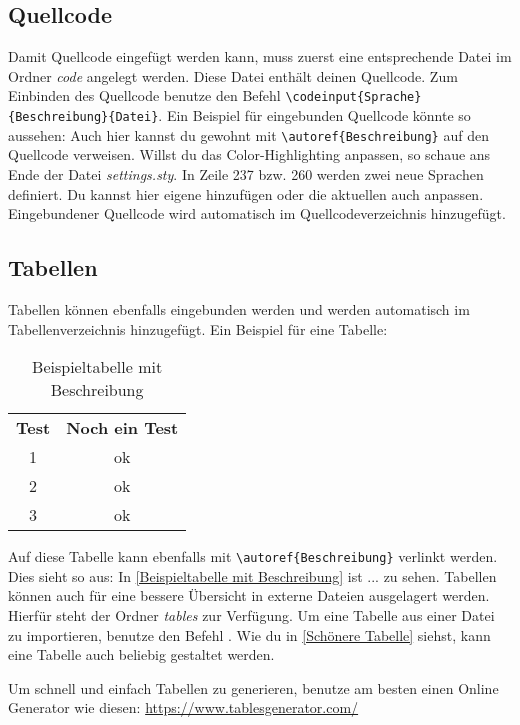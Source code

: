 \newpage
\subsection{Quellcode}
    Damit Quellcode eingefügt werden kann, muss zuerst eine entsprechende Datei im Ordner \textit{code} angelegt werden. Diese Datei enthält deinen Quellcode. Zum Einbinden des Quellcode benutze den Befehl \verb|\codeinput{Sprache}{Beschreibung}{Datei}|. Ein Beispiel für eingebunden Quellcode könnte so aussehen:
    Auch hier kannst du gewohnt mit \verb|\autoref{Beschreibung}| auf den Quellcode verweisen. Willst du das Color-Highlighting anpassen, so schaue ans Ende der Datei \textit{settings.sty}. In Zeile 237 bzw. 260 werden zwei neue Sprachen definiert. Du kannst hier eigene hinzufügen oder die aktuellen auch anpassen. Eingebundener Quellcode wird automatisch im Quellcodeverzeichnis hinzugefügt.

\subsection{Tabellen}
    Tabellen können ebenfalls eingebunden werden und werden automatisch im Tabellenverzeichnis hinzugefügt. Ein Beispiel für eine Tabelle:
    \begin{table}[H]
        \centering
        \begin{tabular}{|c|c|}
            \textbf{Test}   &   \textbf{Noch ein Test} \\
            1               &   ok\\
            2               &   ok\\
            3               &   ok\\
        \end{tabular}
        \caption{Beispieltabelle mit Beschreibung}
        \label{Beispieltabelle mit Beschreibung}
    \end{table}
    \noindent Auf diese Tabelle kann ebenfalls mit \verb|\autoref{Beschreibung}| verlinkt werden. Dies sieht so aus: In \autoref{Beispieltabelle mit Beschreibung} ist ... zu sehen. Tabellen können auch für eine bessere Übersicht in externe Dateien ausgelagert werden. Hierfür steht der Ordner \textit{tables} zur Verfügung. Um eine Tabelle aus einer Datei zu importieren, benutze den Befehl \verb||. Wie du in \autoref{Schönere Tabelle} siehst, kann eine Tabelle auch beliebig gestaltet werden.
    
    \noindent Um schnell und einfach Tabellen zu generieren, benutze am besten einen Online Generator wie diesen: \href{https://www.tablesgenerator.com/}{https://www.tablesgenerator.com/}

